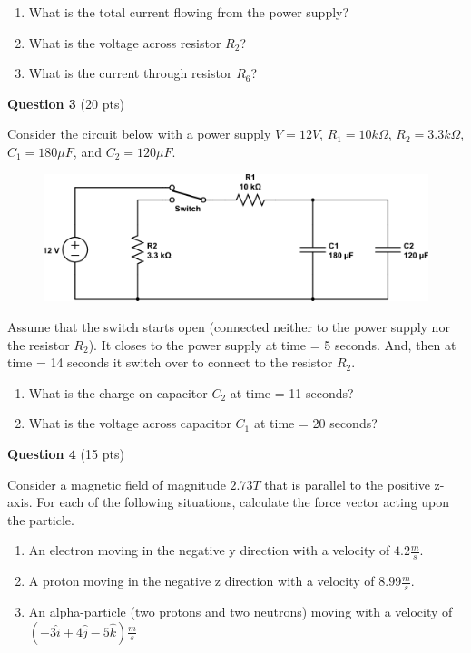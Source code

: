 \documentclass[14pt]{report}
\begin{document}
\begin{enumerate}[label=\Alph*]
\item What is the total current flowing from the power supply?
\item What is the voltage across resistor $R_2$?
\item What is the current through resistor $R_6$?
\end{enumerate}

\newpage
\textbf{Question 3} (20 pts)

Consider the circuit below with a power supply $V=12V$, $R_1 = 10k \Omega$, $R_2 = 3.3k \Omega$, $C_1 = 180 \mu F$, and $C_2 = 120 \mu F$. 

\begin{figure}[H]
\begin{center}
\includegraphics[scale=0.65]{exam2_3.png}
\end{center}
\end{figure}

Assume that the switch starts open (connected neither to the power supply nor the resistor $R_2$). It closes to the power supply at time = 5 seconds. And, then at time = 14 seconds it switch over to connect to the resistor $R_2$. 

\begin{enumerate}[label=\Alph*]
\item What is the charge on capacitor $C_2$ at time = 11 seconds?
\item What is the voltage across capacitor $C_1$ at time = 20 seconds?
\end{enumerate}

\textbf{Question 4} (15 pts)

Consider a magnetic field of magnitude $2.73 T$ that is parallel to the positive z-axis. For each of the following situations, calculate the force vector acting upon the particle.

\begin{enumerate}[label=\Alph*]
\item An electron moving in the negative y direction with a velocity of $4.2 \frac{m}{s}.$
\item A proton moving in the negative z direction with a velocity of $8.99 \frac{m}{s}.$
\item An alpha-particle (two protons and two neutrons) moving with a velocity of $(-3 \hat{i} + 4 \hat{j} - 5 \hat{k}) \frac{m}{s}$
\end{enumerate}
\end{document}
